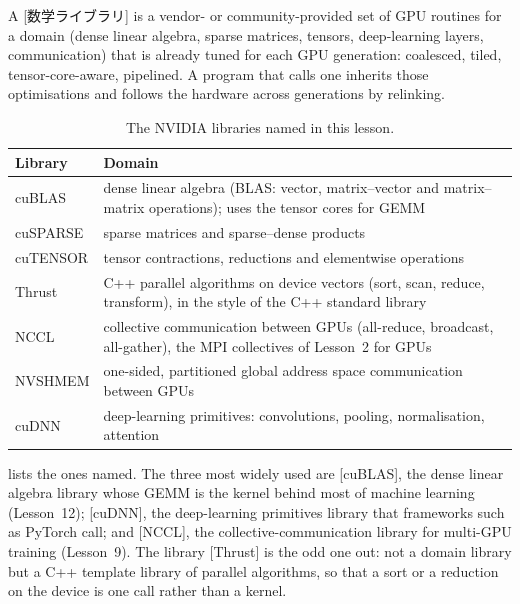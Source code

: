 \documentclass[../main.tex]{subfiles}
\begin{document}
\begin{definition}
  A [数学ライブラリ] is a vendor- or community-provided
  set of GPU routines for a domain (dense linear algebra, sparse
  matrices, tensors, deep-learning layers, communication) that is already
  tuned for each GPU generation: coalesced, tiled, tensor-core-aware,
  pipelined.  A program that calls one inherits those optimisations and
  follows the hardware across generations by relinking.
\end{definition}

\begin{table}[tb]
  \centering
  \small
  \caption{The NVIDIA libraries named in this lesson.}
  \label{tab:l05-libraries}
  \begin{tabular}{>{\raggedright\arraybackslash}p{20mm}
                  >{\raggedright\arraybackslash}p{86mm}}
    \toprule
    Library & Domain \\
    \midrule
    cuBLAS & dense linear algebra (BLAS: vector, matrix--vector and
      matrix--matrix operations); uses the tensor cores for GEMM \\
    cuSPARSE & sparse matrices and sparse--dense products \\
    cuTENSOR & tensor contractions, reductions and elementwise
      operations \\
    Thrust & C++ parallel algorithms on device vectors (sort, scan,
      reduce, transform), in the style of the C++ standard library \\
    NCCL & collective communication between GPUs (all-reduce,
      broadcast, all-gather), the MPI collectives of Lesson~2 for GPUs \\
    NVSHMEM & one-sided, partitioned global address space communication
      between GPUs \\
    cuDNN & deep-learning primitives: convolutions, pooling,
      normalisation, attention \\
    \bottomrule
  \end{tabular}
\end{table}

 lists the ones named.  The three most widely
used are [cuBLAS], the dense linear algebra
library whose GEMM is the kernel behind most of machine learning
(Lesson~12); [cuDNN], the deep-learning primitives library
that frameworks such as PyTorch call; and [NCCL], the
collective-communication library for multi-GPU training (Lesson~9).
The library [Thrust] is the odd one out: not a domain library but a
C++ template library of parallel algorithms, so that a sort or a
reduction on the device is one call rather than a
kernel.
\end{document}
